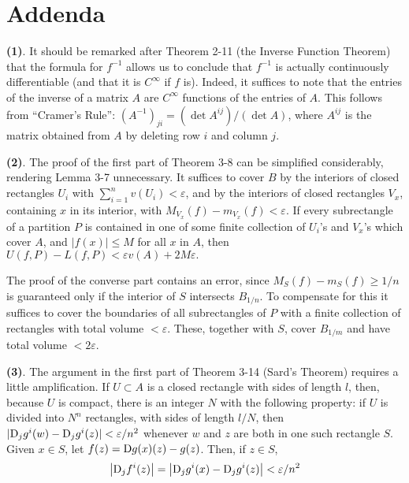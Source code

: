 {\let\cleardoublepage\space
\chapter*{Addenda}}
\hspace*{1em}\textbf{(1)}. It should be remarked after Theorem 2-11 (the Inverse Function Theorem) 
that the formula for $f^{-1}$ allows us to conclude that $f^{-1}$ is actually continuously 
differentiable (and that it is $C^\infty$ if $f$ is). Indeed, it suffices to note that the 
entries of the inverse of a matrix $A$ are $C^\infty$ functions of the entries of $A$. This 
follows from ``Cramer's Rule'': $(A^{-1})_{ji}=(\det A^{ij})/(\det A)$, where $A^{ij}$ is the 
matrix obtained from $A$ by deleting row $i$ and column $j$.

\vspace*{3em}
\textbf{(2)}. The proof of the first part of Theorem 3-8 can be simplified 
considerably, rendering Lemma 3-7 unnecessary. It suffices to cover $B$ by the 
interiors of closed rectangles $U_i$ with $\sum_{i=1}^{n}{v(U_i)}<\varepsilon$, and 
by the interiors of closed rectangles $V_x$, containing $x$ in its interior, with 
$M_{V_x}(f)-m_{V_x}(f)<\varepsilon$. If every subrectangle of a partition $P$ is 
contained in one of some finite collection of $U_i$'s and $V_x$'s which
cover $A$, and $|f(x)|\le M$ for all $x$ in $A$, then $U(f, P) - L(f, P)
<\varepsilon v(A)+2M\varepsilon.$

The proof of the converse part contains an error, since
$M_S(f)-m_S(f)\ge 1/n$ is guaranteed only if the interior of $S$
intersects $B_{1/n}$. To compensate for this it suffices to cover the
boundaries of all subrectangles of $P$ with a finite collection of
rectangles with total volume $< \varepsilon$. These, together with $S$,
cover $B_{1/m}$ and have total volume $< 2\varepsilon$.

\vspace*{3em}
\textbf{(3)}. The argument in the first part of Theorem 3-14 (Sard's Theorem) requires 
a little amplification. If $U\subset A$ is a closed rectangle with sides of length $l$, 
then, because $U$ is compact, there is an integer $N$ with the following property: if $U$ 
is divided into $N^n$ rectangles, with sides of length $l/N$, then $|\mathrm{D}_jg^i(w) - \mathrm{D}_jg^i(z)|<\varepsilon/n^2$
whenever $w$ and $z$ are both in one such rectangle $S$. Given $x\in S$, let $f(z)=\mathrm{D}g(x)(z)-g(z)$.
Then, if $z\in S$,
\begin{align*}
    \left|\mathrm{D}_jf^i(z)\right|=\left|\mathrm{D}_jg^i(x)-\mathrm{D}_jg^i(z)\right|<\varepsilon/n^2
\end{align*}

